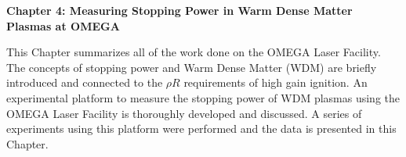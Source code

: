 \textbf{Chapter 4: Measuring Stopping Power in Warm Dense Matter Plasmas at OMEGA}

This Chapter summarizes all of the work done on the OMEGA Laser Facility. The concepts of stopping power and Warm Dense Matter (WDM) are briefly introduced and connected to the $\rho R$ requirements of high gain ignition. An experimental platform to measure the stopping power of WDM plasmas using the OMEGA Laser Facility is thoroughly developed and discussed. A series of experiments using this platform were performed and the data is presented in this Chapter. 